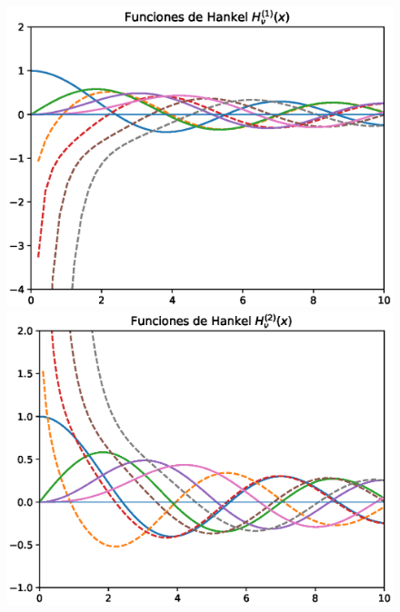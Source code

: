 \begin{figure}[H]
    \centering
    \begin{minipage}{0.4\linewidth}
        \includegraphics[scale=0.6]{Imagenes/plot_Hankel_01.eps}
    \end{minipage}
    \hspace{1cm}
    \begin{minipage}{0.4\linewidth}
        \includegraphics[scale=0.6]{Imagenes/plot_Hankel_02.eps}
    \end{minipage}
\end{figure}
